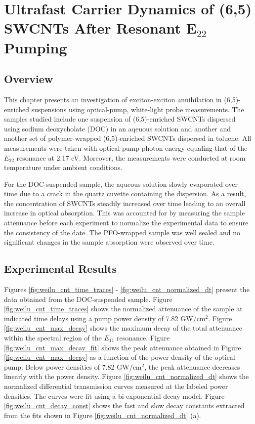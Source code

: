 \chapter{Ultrafast Carrier Dynamics of (6,5) SWCNTs After Resonant E$_{22}$ Pumping}

\section{Overview}

This chapter presents an investigation of exciton-exciton annihilation in (6,5)-enriched suspensions using optical-pump, white-light probe measurements. The samples studied include one suspension of (6,5)-enriched SWCNTs dispersed using sodium deoxycholate (DOC) in an aqeuous solution and another and another set of polymer-wrapped (6,5)-enriched SWCNTs dispersed in toluene. All measurements were taken with optical pump photon energy equaling that of the $E_{22}$ resonance at 2.17 eV. Moreover, the measurements were conducted at room temperature under ambient conditions.

For the DOC-suspended sample, the aqueous solution slowly evaporated over time due to a crack in the quartz cuvette containing the dispersion. As a result, the concentration of SWCNTs steadily increased over time leading to an overall increase in optical absorption. This was accounted for by measuring the sample attenuance before each experiment to normalize the experimental data to ensure the consistency of the date. The PFO-wrapped sample was well sealed and no significant changes in the sample absorption were observed over time.


\section{Experimental Results}
Figures \ref{fig:weilu_cnt_time_traces} - \ref{fig:weilu_cnt_normalized_dt} present the data obtained from the DOC-suspended sample. Figure \ref{fig:weilu_cnt_time_traces} shows the normalized attenuance of the sample at indicated time delays using a pump power density of 7.82 GW/cm$^2$. Figure \ref{fig:weilu_cnt_max_decay} shows the maximum decay of the total attenuance within the spectral region of the $E_{11}$ resonance. Figure \ref{fig:weilu_cnt_max_decay_fit} shows the peak attenuance obtained in Figure \ref{fig:weilu_cnt_max_decay} as a function of the power density of the optical pump. Below power densities of 7.82 GW/cm$^2$, the peak attenuance decreases linearly with the power density. Figure \ref{fig:weilu_cnt_normalized_dt} shows the normalized differential transmission curves measured at the labeled power densities. The curves were fit using a bi-exponential decay model. Figure \ref{fig:weilu_cnt_decay_const} shows the fast and slow decay constants extracted from the fits shown in Figure \ref{fig:weilu_cnt_normalized_dt} (a).

